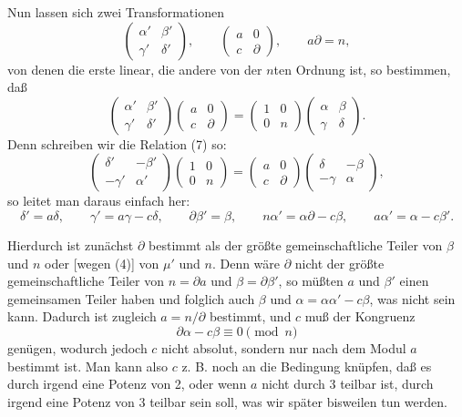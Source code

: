 \documentclass[11pt]{article}
\begin{document}
Nun lassen sich zwei Transformationen
\[
 \begin{pmatrix}\alpha'&\beta'\\ \gamma'&\delta'\end{pmatrix},
 \qquad
 \begin{pmatrix}a&0\\ c&\partial\end{pmatrix},
 \qquad a\partial=n,
\]
von denen die erste linear, die andere von der $n$ten Ordnung ist, so bestimmen, daß
\begin{equation}
 \begin{pmatrix}\alpha'&\beta'\\ \gamma'&\delta'\end{pmatrix}
 \begin{pmatrix}a&0\\ c&\partial\end{pmatrix}
 =
 \begin{pmatrix}1&0\\0&n\end{pmatrix}
 \begin{pmatrix}\alpha&\beta\\ \gamma&\delta\end{pmatrix}.
\tag{7}
\end{equation}
Denn schreiben wir die Relation (7) so:
\[
 \begin{pmatrix}\delta'&-\beta'\\-\gamma'&\alpha'\end{pmatrix}
 \begin{pmatrix}1&0\\0&n\end{pmatrix}
 =
 \begin{pmatrix}a&0\\c&\partial\end{pmatrix}
 \begin{pmatrix}\delta&-\beta\\-\gamma&\alpha\end{pmatrix},
\]
so leitet man daraus einfach her:
\begin{equation}
 \delta'=a\delta,
 \qquad \gamma'=a\gamma-c\delta,
 \qquad \partial\beta'=\beta,
 \qquad n\alpha'=\alpha\partial-c\beta,
 \qquad a\alpha'=\alpha-c\beta'.
\tag{8}
\end{equation}

Hierdurch ist zunächst $\partial$ bestimmt als der größte gemeinschaftliche Teiler von
$\beta$ und $n$ oder [wegen (4)] von $\mu'$ und $n$. Denn wäre $\partial$ nicht der größte
gemeinschaftliche Teiler von $n=\partial a$ und $\beta=\partial\beta'$, so müßten $a$ und
$\beta'$ einen gemeinsamen Teiler haben und folglich auch $\beta$ und
$\alpha=\alpha\alpha'-c\beta$, was nicht sein kann. Dadurch ist zugleich $a=n/\partial$
bestimmt, und $c$ muß der Kongruenz
\begin{equation}
 \partial\alpha-c\beta\equiv0\pmod n
\tag{9}
\end{equation}
genügen, wodurch jedoch $c$ nicht absolut, sondern nur nach dem Modul $a$ bestimmt ist.
Man kann also $c$ z. B. noch an die Bedingung knüpfen, daß es durch irgend eine Potenz
von 2, oder wenn $a$ nicht durch 3 teilbar ist, durch irgend eine Potenz von 3 teilbar sein
soll, was wir später bisweilen tun werden.
\end{document}

